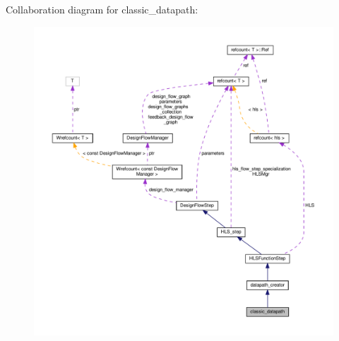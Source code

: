 Collaboration diagram for classic\+\_\+datapath\+:
\nopagebreak
\begin{figure}[H]
\begin{center}
\leavevmode
\includegraphics[width=350pt]{d3/db6/classclassic__datapath__coll__graph}
\end{center}
\end{figure}

